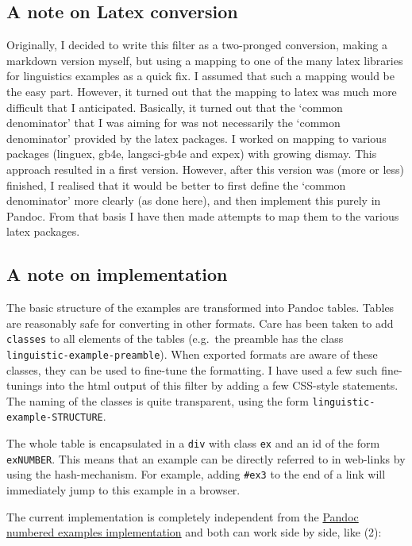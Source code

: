 \documentclass[
]{article}
\begin{document}
\hypertarget{a-note-on-latex-conversion}{%
\subsection{A note on Latex
conversion}\label{a-note-on-latex-conversion}}

Originally, I decided to write this filter as a two-pronged conversion,
making a markdown version myself, but using a mapping to one of the many
latex libraries for linguistics examples as a quick fix. I assumed that
such a mapping would be the easy part. However, it turned out that the
mapping to latex was much more difficult that I anticipated. Basically,
it turned out that the `common denominator' that I was aiming for was
not necessarily the `common denominator' provided by the latex packages.
I worked on mapping to various packages (linguex, gb4e, langsci-gb4e and
expex) with growing dismay. This approach resulted in a first version.
However, after this version was (more or less) finished, I realised that
it would be better to first define the `common denominator' more clearly
(as done here), and then implement this purely in Pandoc. From that
basis I have then made attempts to map them to the various latex
packages.

\hypertarget{a-note-on-implementation}{%
\subsection{A note on implementation}\label{a-note-on-implementation}}

The basic structure of the examples are transformed into Pandoc tables.
Tables are reasonably safe for converting in other formats. Care has
been taken to add \texttt{classes} to all elements of the tables
(e.g.~the preamble has the class \texttt{linguistic-example-preamble}).
When exported formats are aware of these classes, they can be used to
fine-tune the formatting. I have used a few such fine-tunings into the
html output of this filter by adding a few CSS-style statements. The
naming of the classes is quite transparent, using the form
\texttt{linguistic-example-STRUCTURE}.

The whole table is encapsulated in a \texttt{div} with class \texttt{ex}
and an id of the form \texttt{exNUMBER}. This means that an example can
be directly referred to in web-links by using the hash-mechanism. For
example, adding \texttt{\#ex3} to the end of a link will immediately
jump to this example in a browser.

The current implementation is completely independent from the
\href{https://pandoc.org/MANUAL.html\#numbered-example-lists}{Pandoc
numbered examples implementation} and both can work side by side, like
(2):
\end{document}
